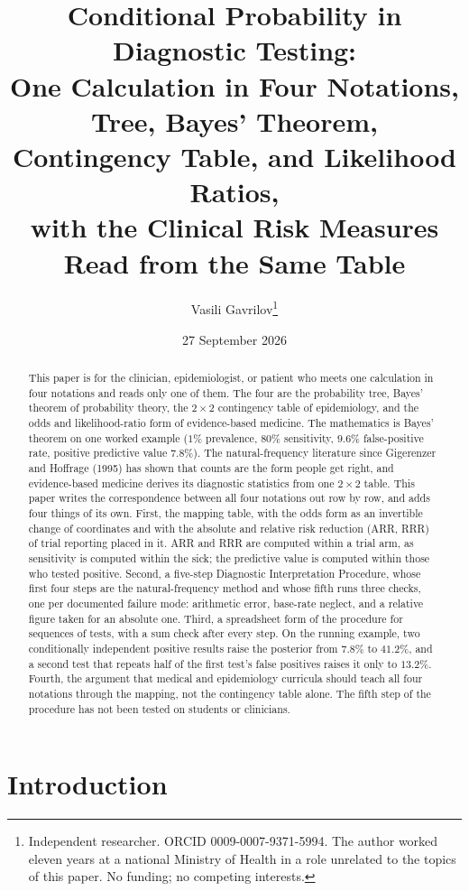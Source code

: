 \documentclass[11pt]{article}
\title{Conditional Probability in Diagnostic Testing:\\
  One Calculation in Four Notations, Tree, Bayes' Theorem,\\
  Contingency Table, and Likelihood Ratios,\\
  \large with the Clinical Risk Measures Read from the Same Table}
\author{Vasili Gavrilov\thanks{Independent researcher. ORCID 0009-0007-9371-5994. The author worked eleven years at a national Ministry of Health in a role unrelated to the topics of this paper. No funding; no competing interests.}}
\date{27 September 2026}
\begin{document}
\maketitle

\begin{abstract}
\noindent This paper is for the clinician, epidemiologist, or patient who meets one calculation in four notations and reads only one of them. The four are the probability tree, Bayes' theorem of probability theory, the $2\times 2$ contingency table of epidemiology, and the odds and likelihood-ratio form of evidence-based medicine. The mathematics is Bayes' theorem on one worked example ($1\%$ prevalence, $80\%$ sensitivity, $9.6\%$ false-positive rate, positive predictive value $7.8\%$). The natural-frequency literature since Gigerenzer and Hoffrage (1995) has shown that counts are the form people get right, and evidence-based medicine derives its diagnostic statistics from one $2\times 2$ table. This paper writes the correspondence between all four notations out row by row, and adds four things of its own. First, the mapping table, with the odds form as an invertible change of coordinates and with the absolute and relative risk reduction (ARR, RRR) of trial reporting placed in it. ARR and RRR are computed within a trial arm, as sensitivity is computed within the sick; the predictive value is computed within those who tested positive. Second, a five-step Diagnostic Interpretation Procedure, whose first four steps are the natural-frequency method and whose fifth runs three checks, one per documented failure mode: arithmetic error, base-rate neglect, and a relative figure taken for an absolute one. Third, a spreadsheet form of the procedure for sequences of tests, with a sum check after every step. On the running example, two conditionally independent positive results raise the posterior from $7.8\%$ to $41.2\%$, and a second test that repeats half of the first test's false positives raises it only to $13.2\%$. Fourth, the argument that medical and epidemiology curricula should teach all four notations through the mapping, not the contingency table alone. The fifth step of the procedure has not been tested on students or clinicians.
\end{abstract}

\section{Introduction}
\end{document}

